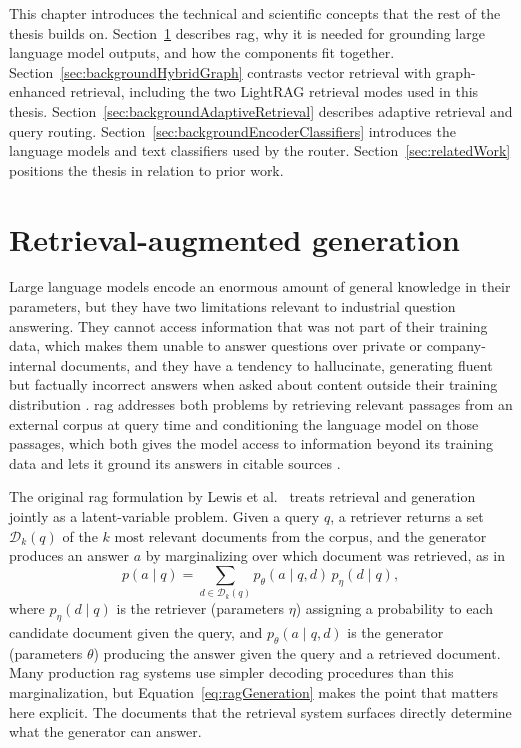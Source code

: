 \documentclass[english, bibtex]{kththesis}               %
\numberwithin{listing}{chapter}
\begin{document}
This chapter introduces the technical and scientific concepts that the rest of the thesis builds on. Section~\ref{sec:backgroundRag} describes \gls{rag}, why it is needed for grounding large language model outputs, and how the components fit together. Section~\ref{sec:backgroundHybridGraph} contrasts vector retrieval with graph-enhanced retrieval, including the two LightRAG retrieval modes used in this thesis. Section~\ref{sec:backgroundAdaptiveRetrieval} describes adaptive retrieval and query routing. Section~\ref{sec:backgroundEncoderClassifiers} introduces the language models and text classifiers used by the router. Section~\ref{sec:relatedWork} positions the thesis in relation to prior work.

\section{Retrieval-augmented generation}
\label{sec:backgroundRag}

Large language models encode an enormous amount of general knowledge in their parameters, but they have two limitations relevant to industrial question answering. They cannot access information that was not part of their training data, which makes them unable to answer questions over private or company-internal documents, and they have a tendency to hallucinate, generating fluent but factually incorrect answers when asked about content outside their training distribution \cite{gao2023ragsurvey}. \Gls{rag} addresses both problems by retrieving relevant passages from an external corpus at query time and conditioning the language model on those passages, which both gives the model access to information beyond its training data and lets it ground its answers in citable sources \cite{lewis2020rag,gao2023ragsurvey}.

The original \gls{rag} formulation by Lewis et al.\ \cite{lewis2020rag} treats retrieval and generation jointly as a latent-variable problem. Given a query \(q\), a retriever returns a set \(\mathcal{D}_k(q)\) of the \(k\) most relevant documents from the corpus, and the generator produces an answer \(a\) by marginalizing over which document was retrieved, as in
\begin{equation}
\label{eq:ragGeneration}
p(a \mid q) =
\sum_{d \in \mathcal{D}_k(q)}
p_\theta(a \mid q,d)\,p_\eta(d \mid q),
\end{equation}
where \(p_\eta(d \mid q)\) is the retriever (parameters \(\eta\)) assigning a probability to each candidate document given the query, and \(p_\theta(a \mid q, d)\) is the generator (parameters \(\theta\)) producing the answer given the query and a retrieved document. Many production \gls{rag} systems use simpler decoding procedures than this marginalization, but Equation~\ref{eq:ragGeneration} makes the point that matters here explicit. The documents that the retrieval system surfaces directly determine what the generator can answer.
\end{document}
